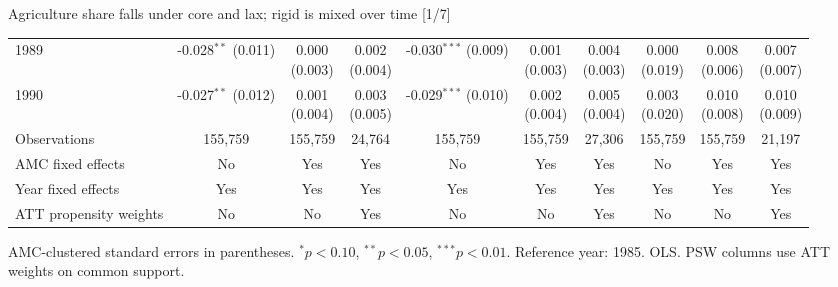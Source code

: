\documentclass[aspectratio=169]{beamer}
\begin{document}
\begin{frame}{Agriculture share falls under core and lax; rigid is mixed over time [1/7]}
{\begin{tabular}{@{}l*{9}{c}@{}}
1989 & \shortstack{-0.028$^{**}$\\(0.011)} & \shortstack{0.000\\(0.003)} & \shortstack{0.002\\(0.004)} & \shortstack{-0.030$^{***}$\\(0.009)} & \shortstack{0.001\\(0.003)} & \shortstack{0.004\\(0.003)} & \shortstack{0.000\\(0.019)} & \shortstack{0.008\\(0.006)} & \shortstack{0.007\\(0.007)} \\
1990 & \shortstack{-0.027$^{**}$\\(0.012)} & \shortstack{0.001\\(0.004)} & \shortstack{0.003\\(0.005)} & \shortstack{-0.029$^{***}$\\(0.010)} & \shortstack{0.002\\(0.004)} & \shortstack{0.005\\(0.004)} & \shortstack{0.003\\(0.020)} & \shortstack{0.010\\(0.008)} & \shortstack{0.010\\(0.009)} \\
\midrule
Observations & 155,759 & 155,759 & 24,764 & 155,759 & 155,759 & 27,306 & 155,759 & 155,759 & 21,197 \\
AMC fixed effects & No & Yes & Yes & No & Yes & Yes & No & Yes & Yes \\
Year fixed effects & Yes & Yes & Yes & Yes & Yes & Yes & Yes & Yes & Yes \\
ATT propensity weights & No & No & Yes & No & No & Yes & No & No & Yes \\
\bottomrule
\end{tabular}%
}
\vspace{0.1em}
{\tiny\color{ZMidGray} AMC-clustered standard errors in parentheses. $^{*}p<0.10$, $^{**}p<0.05$, $^{***}p<0.01$. Reference year: 1985. OLS. PSW columns use ATT weights on common support.}
\end{frame}
\end{document}

